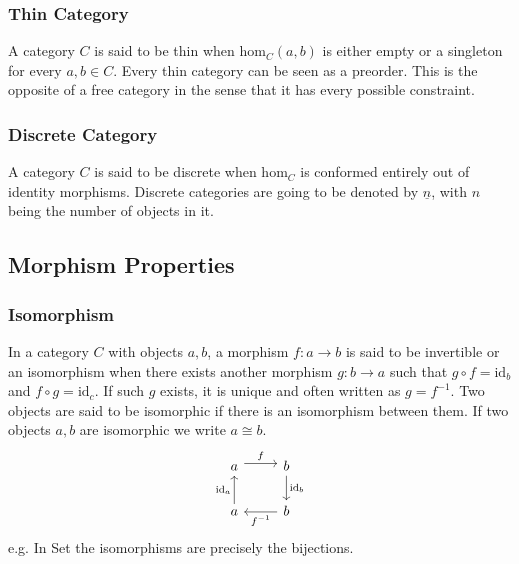 \subsubsection*{Thin Category}
A category $C$ is said to be thin when $\mathrm{hom}_C(a, b)$ is either empty or
a singleton for every $a,b\in C$. \parencite{adamek_herrlich_strecker:joy_cats}
Every thin category can be seen as a preorder. This is the opposite of a free
category in the sense that it has every possible constraint.

\subsubsection*{Discrete Category}
A category $C$ is said to be discrete when $\mathrm{hom}_C$ is conformed
entirely out of identity morphisms. \parencite{awodey:category_theory} Discrete
categories are going to be denoted by $\underline{n}$, with $n$ being the number
of objects in it.

\subsection{Morphism Properties}

\subsubsection*{Isomorphism}
In a category $C$ with objects $a, b$, a morphism $f: a\to b$ is said to be
invertible or an isomorphism when there exists another morphism $g:b \to a$ such
that $g\circ f = \mathrm{id}_b$ and $f\circ g = \mathrm{id}_c$.
\parencite{maclane:working_mathematician}
If such $g$ exists, it is unique and often written as $g= f^{-1}$. Two objects
are said to be isomorphic if there is an isomorphism between them. If two
objects $a,b$ are isomorphic we write $a\cong b$.
\[\begin{tikzcd}
	a & b \\
	a & b
	\arrow["f", shift left=1, from=1-1, to=1-2]
	\arrow["{f^{-1}}", from=2-2, to=2-1]
	\arrow["{\mathrm{id}_a}", from=2-1, to=1-1]
	\arrow["{\mathrm{id}_b}", from=1-2, to=2-2]
\end{tikzcd}\]
e.g. In Set the isomorphisms are precisely the bijections.

